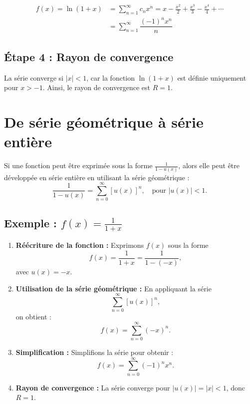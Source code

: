 \documentclass{report}
\begin{document}
\begin{multicols*}{3}
    \begin{align*}
        f(x) = \ln(1 + x) &= \sum_{n=1}^\infty c_n x^n = x - \frac{x^2}{2} + \frac{x^3}{3} 
    - \frac{x^4}{4} + \cdots 
    \\ 
                          &= \sum_{n=1}^\infty \dfrac{(-1)^nx^n }{n} 
    \end{align*}            


    \subsection*{Étape 4 : Rayon de convergence}
    La série converge si \(|x| < 1\), car la fonction \(\ln(1 + x)\) est définie 
    uniquement pour \(x > -1\). Ainsi, le rayon de convergence est \(R = 1\).

    \section{De série géométrique à série entière}


    Si une fonction peut être exprimée sous la forme \( \frac{1}{1 - u(x)} \), alors 
    elle peut être développée en série entière en utilisant la série géométrique :
    \[
    \frac{1}{1 - u(x)} = \sum_{n=0}^\infty [u(x)]^n, \quad \text{pour } |u(x)| < 1.
    \]

    \subsection*{Exemple : \( f(x) = \frac{1}{1 + x} \)}

    \begin{enumerate}
        \item \textbf{Réécriture de la fonction :} Exprimons \( f(x) \) sous la forme
        \[
        f(x) = \frac{1}{1 + x} = \frac{1}{1 - (-x)},
        \]
        avec \( u(x) = -x \).
        
        \item \textbf{Utilisation de la série géométrique :} En appliquant la série 
        \[
        \sum_{n=0}^\infty [u(x)]^n, 
        \]
        on obtient :
        \[
        f(x) = \sum_{n=0}^\infty (-x)^n.
        \]

        \item \textbf{Simplification :} Simplifions la série pour obtenir :
        \[
        f(x) = \sum_{n=0}^\infty (-1)^n x^n.
        \]

        \item \textbf{Rayon de convergence :} La série converge pour \( |u(x)| = |x| < 1 \),
        donc \( R = 1 \).
    \end{enumerate}


\end{multicols*}
\end{document}
